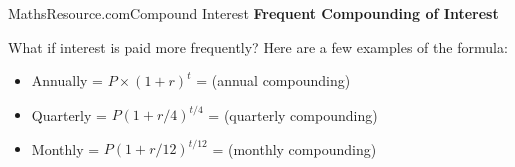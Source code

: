 \documentclass{beamer}
\begin{document}
\begin{frame}{MathsResource.com}{Compound Interest}
\Large
\vspace{-1cm}
\textbf{Frequent Compounding of Interest}

What if interest is paid more frequently?
Here are a few examples of the formula:

\begin{itemize}
\item Annually = $P × (1 + r)^t$ = (annual compounding)
\item Quarterly = $P (1 + r/4)^{t/4}$ = (quarterly compounding)
\item Monthly = $P(1 + r/12)^{t/12}$ = (monthly compounding)
\end{itemize}
\end{frame}
\end{document}
